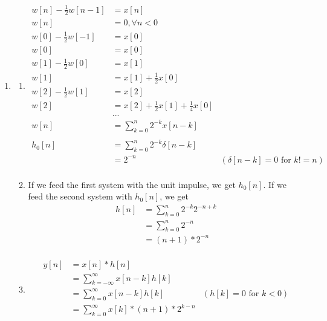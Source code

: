 \documentclass[10pt,a4paper, margin=1in]{article}
\begin{document}
\begin{enumerate}
\item %
    \begin{enumerate}
    \item %
    \begin{align*}
        w[n] - \frac{1}{2}w[n - 1] & = x[n]\\
        w[n] & = 0,  \forall n < 0 \\
        w[0] - \frac{1}{2}w[-1] & = x[0]\\
        w[0] & = x[0]\\
        w[1] - \frac{1}{2}w[0] & = x[1]\\
        w[1] & = x[1] + \frac{1}{2}x[0]\\
        w[2] - \frac{1}{2}w[1] & = x[2]\\
        w[2] & = x[2] + \frac{1}{2}x[1] + \frac{1}{4}x[0]\\
        &...\\
        w[n] & = \sum_{k = 0}^{n} 2^{-k}x[n - k]\\
        & \\
        h_0[n] & = \sum_{k = 0}^{n} 2^{-k}\delta[n - k]\\
        & = 2^{-n} & (\delta[n-k] = 0 \text{ for } k != n)\\
    \end{align*}
    \item
    If we feed the first system with the unit impulse, we get $h_0[n]$. If we feed the second system with $h_0[n]$, we get
    \begin{align*}
        h[n] &= \sum_{k = 0}^{n} 2^{-k}2^{-n+k} \\
        &= \sum_{k = 0}^{n} 2^{-n} \\
        &= (n+1) * 2^{-n} \\
    \end{align*}
    \item \begin{align*}
        y[n] &= x[n] * h[n] \\
        &= \sum_{k = -\infty}^{\infty} x[n-k]h[k] \\
        &= \sum_{k = 0}^{\infty} x[n-k]h[k] & (h[k] = 0 \text{ for } k < 0)\\
        &= \sum_{k = 0}^{\infty} x[k]*(n+1) * 2^{k-n} \\
    \end{align*}
    \end{enumerate}
    

\end{enumerate}
\end{document}

